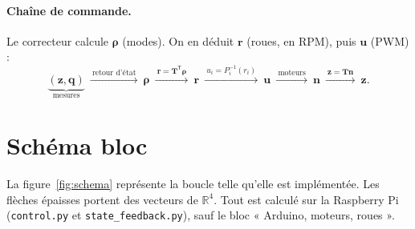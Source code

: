 \documentclass[11pt,a4paper]{article}
\newcommand{\vect}[1]{\boldsymbol{#1}}
\newcommand{\T}{\mathsf{T}}
\newcommand{\Tm}{\vect{T}}
\begin{document}
\paragraph{Chaîne de commande.}
Le correcteur calcule $\vect\rho$ (modes). On en déduit $\vect r$ (roues, en RPM), puis $\vect u$ (PWM) :
\[
\underbrace{(\vect z,\vect q)}_{\text{mesures}}
\ \xrightarrow{\ \text{retour d'état}\ }\ \vect\rho
\ \xrightarrow{\ \vect r=\Tm^\T\vect\rho\ }\ \vect r
\ \xrightarrow{\ u_i=P_i^{-1}(r_i)\ }\ \vect u
\ \xrightarrow{\ \text{moteurs}\ }\ \vect n
\ \xrightarrow{\ \vect z=\Tm\vect n\ }\ \vect z .
\]

\section{Schéma bloc}\label{sec:schema}

La figure~\ref{fig:schema} représente la boucle telle qu'elle est implémentée.
Les flèches épaisses portent des vecteurs de $\mathbb R^4$.
Tout est calculé sur la Raspberry Pi (\texttt{control.py} et \texttt{state\_feedback.py}), sauf le bloc « Arduino, moteurs, roues ».
\end{document}
